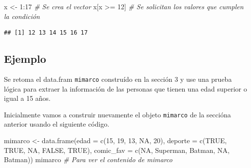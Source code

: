 \documentclass[
]{book}
\newenvironment{Shaded}{\begin{snugshade}}{\end{snugshade}}
\newcommand{\AttributeTok}[1]{\textcolor[rgb]{0.77,0.63,0.00}{#1}}
\newcommand{\CommentTok}[1]{\textcolor[rgb]{0.56,0.35,0.01}{\textit{#1}}}
\newcommand{\ConstantTok}[1]{\textcolor[rgb]{0.00,0.00,0.00}{#1}}
\newcommand{\DecValTok}[1]{\textcolor[rgb]{0.00,0.00,0.81}{#1}}
\newcommand{\FunctionTok}[1]{\textcolor[rgb]{0.00,0.00,0.00}{#1}}
\newcommand{\NormalTok}[1]{#1}
\newcommand{\OtherTok}[1]{\textcolor[rgb]{0.56,0.35,0.01}{#1}}
\newcommand{\SpecialCharTok}[1]{\textcolor[rgb]{0.00,0.00,0.00}{#1}}
\newcommand{\StringTok}[1]{\textcolor[rgb]{0.31,0.60,0.02}{#1}}
\begin{document}
\begin{Shaded}
\begin{Highlighting}[]
\NormalTok{x }\OtherTok{\textless{}{-}} \DecValTok{1}\SpecialCharTok{:}\DecValTok{17}  \CommentTok{\# Se crea el vector}
\NormalTok{x[x }\SpecialCharTok{\textgreater{}=} \DecValTok{12}\NormalTok{]  }\CommentTok{\# Se solicitan los valores que cumplen la condición}
\end{Highlighting}
\end{Shaded}

\begin{verbatim}
## [1] 12 13 14 15 16 17
\end{verbatim}

\hypertarget{ejemplo-7}{%
\subsection*{Ejemplo}\label{ejemplo-7}}

Se retoma el data.fram \texttt{mimarco} construído en la sección 3 y use una prueba lógica para extraer la información de las personas que tienen una edad superior o igual a 15 años.

Inicialmente vamos a construir nuevamente el objeto \texttt{mimarco} de la seccióna anterior usando el siguiente código.

\begin{Shaded}
\begin{Highlighting}[]
\NormalTok{mimarco }\OtherTok{\textless{}{-}} \FunctionTok{data.frame}\NormalTok{(}\AttributeTok{edad =} \FunctionTok{c}\NormalTok{(}\DecValTok{15}\NormalTok{, }\DecValTok{19}\NormalTok{, }\DecValTok{13}\NormalTok{, }\ConstantTok{NA}\NormalTok{, }\DecValTok{20}\NormalTok{), }
                      \AttributeTok{deporte =} \FunctionTok{c}\NormalTok{(}\ConstantTok{TRUE}\NormalTok{, }\ConstantTok{TRUE}\NormalTok{, }\ConstantTok{NA}\NormalTok{, }\ConstantTok{FALSE}\NormalTok{, }\ConstantTok{TRUE}\NormalTok{),}
                      \AttributeTok{comic\_fav =} \FunctionTok{c}\NormalTok{(}\ConstantTok{NA}\NormalTok{, }\StringTok{\textquotesingle{}Superman\textquotesingle{}}\NormalTok{, }\StringTok{\textquotesingle{}Batman\textquotesingle{}}\NormalTok{, }\ConstantTok{NA}\NormalTok{, }\StringTok{\textquotesingle{}Batman\textquotesingle{}}\NormalTok{))}
\NormalTok{mimarco  }\CommentTok{\# Para ver el contenido de mimarco}
\end{Highlighting}
\end{Shaded}
\end{document}
